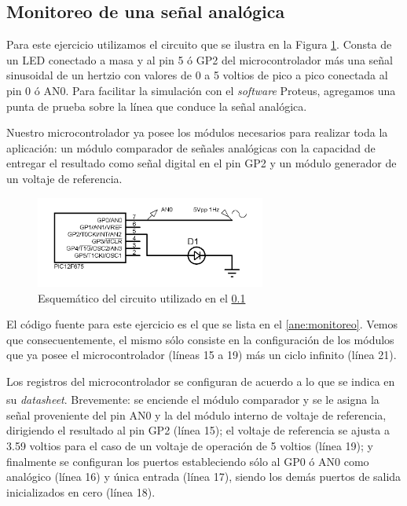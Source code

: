 \documentclass[a4paper]{article}
\let\originalcite\cite
\renewcommand{\cite}[2][]{\textsuperscript{\originalcite{#2}}}
\newenvironment{ejercicios}
    {\setcounter{secnumdepth}{3}
    \renewcommand\thesubsection{Ejercicio \arabic{subsection}}}
    {\setcounter{secnumdepth}{0}}
\begin{document}
\begin{ejercicios}

    \subsection{Monitoreo de una señal analógica}\label{ej:monitoreo}

    Para este ejercicio utilizamos el circuito que se ilustra en la
    Figura \ref{fig:esquematico1}. Consta de un LED conectado a masa 
    y al pin 5 ó GP2 del microcontrolador más una señal sinusoidal de
    un hertzio con valores de 0 a 5 voltios de pico a pico 
    conectada al pin 0 ó AN0. Para facilitar la simulación con el 
    \textit{software} Proteus, agregamos una punta de prueba sobre la 
    línea que conduce la señal analógica.
    
    Nuestro microcontrolador ya posee los módulos necesarios para 
    realizar toda la aplicación: un módulo comparador de señales 
    analógicas con la capacidad de entregar el resultado como señal 
    digital en el pin GP2 y un módulo generador de un voltaje de 
    referencia.

    \begin{figure}[h]\centering
        \includegraphics[height=3cm]{esquematico1.png}
        \caption{Esquemático del circuito utilizado en el  
        \ref{ej:monitoreo}}\label{fig:esquematico1}
    \end{figure}

    El código fuente para este ejercicio es el que se lista en el 
    \ref{ane:monitoreo}. Vemos que consecuentemente, el mismo sólo
    consiste en la configuración de los módulos que ya posee el 
    microcontrolador (líneas 15 a 19) más un ciclo infinito (línea 21).

    Los registros del microcontrolador se configuran de acuerdo a lo 
    que se indica en su \textit{datasheet}\cite{bid:datasheet}. 
    Brevemente: se enciende el módulo comparador y se le asigna la
    señal proveniente del pin AN0 y la del módulo interno de voltaje 
    de referencia, dirigiendo el resultado al pin GP2 (línea 15); el 
    voltaje de referencia se ajusta a 3.59 voltios para el caso de un
    voltaje de operación de 5 voltios (línea 19); y finalmente se 
    configuran los puertos estableciendo sólo al GP0 ó AN0 como 
    analógico (línea 16) y única entrada (línea 17), siendo los demás
    puertos de salida inicializados en cero (línea 18).

\end{ejercicios}
\end{document}
